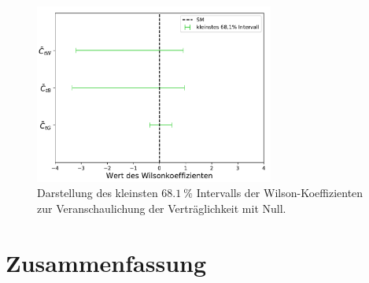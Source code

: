 \begin{figure}
    \centering
    \includegraphics[width=0.7\textwidth]{Plots/wilson.pdf}
    \caption{Darstellung des kleinsten $\SI{68.1}{\percent}$ Intervalls der Wilson-Koeffizienten zur Veranschaulichung der Verträglichkeit mit Null.}
    \label{fig:wil}
\end{figure}
%
%
\chapter{Zusammenfassung}
